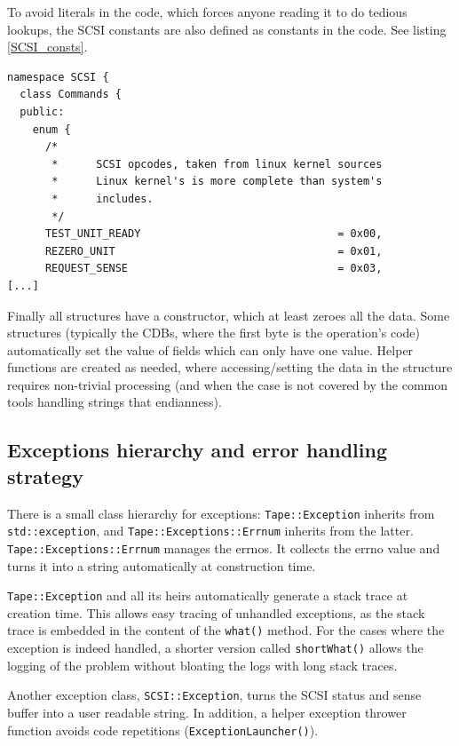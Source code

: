 To avoid literals in the code, which forces anyone reading it to do tedious lookups,
the SCSI constants are also defined as constants in the code. See listing \ref{SCSI_consts}.

\begin{table}
\begin{lstlisting}[caption=SCSI::Constants,label=SCSI_consts]
namespace SCSI {
  class Commands {
  public:
    enum {
      /*
       *      SCSI opcodes, taken from linux kernel sources
       *      Linux kernel's is more complete than system's
       *      includes.
       */
      TEST_UNIT_READY                               = 0x00,
      REZERO_UNIT                                   = 0x01,
      REQUEST_SENSE                                 = 0x03,
[...]
\end{lstlisting}
\end{table}

Finally all structures have a constructor, which at least zeroes all the data.
Some structures (typically the CDBs, where the first byte is the operation's code)
automatically set the value of fields which can only have one value. Helper
functions are created as needed, where accessing/setting the data in the structure
requires non-trivial processing (and when the case is not covered by the common
tools handling strings that endianness).

\subsection{Exceptions hierarchy and error handling strategy}

There is a small class hierarchy for exceptions: \verb#Tape::Exception# inherits from
\verb#std::exception#, and \verb#Tape::Exceptions::Errnum# inherits from the latter.
\verb#Tape::Exceptions::Errnum# manages the errnos. It collects the errno value and turns it
into a string automatically at construction time.

\verb#Tape::Exception# and all its heirs automatically generate a stack trace at creation time.
This allows easy tracing of unhandled exceptions, as the stack trace is embedded in the content
of the \verb#what()# method. For the cases where the exception is indeed handled, a shorter version
called \verb#shortWhat()# allows the logging of the problem without bloating the logs with long stack 
traces.

Another exception class, \verb#SCSI::Exception#, turns the SCSI status and sense buffer into a
user readable string. In addition, a helper exception thrower function avoids code
repetitions (\verb#ExceptionLauncher()#).

